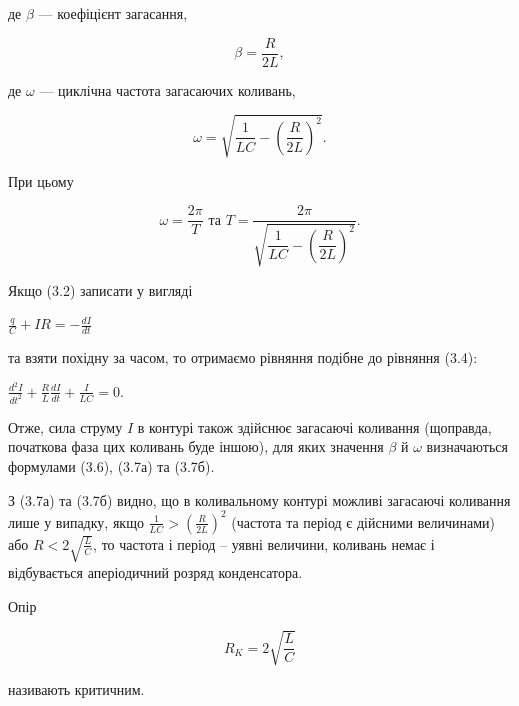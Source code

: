 \documentclass[12pt,a4paper]{article}
\begin{document}
    де $\beta$ --- коефіцієнт загасання,

    \begin{equation}
        \beta = \frac{R}{2L},
        \tag{3.6}
    \end{equation}

    де $\omega$ --- циклічна частота загасаючих коливань,

    \begin{equation}
        \omega = \sqrt{\frac{1}{LC} - \left( \frac{R}{2L}\right)^2}.
        \tag{3.7а}
    \end{equation}

    При цьому

    \begin{equation}
        \omega = \frac{2\pi}{T} \text{  та  } T = \frac{2\pi}{\sqrt{\dfrac{1}{LC} - \left( \dfrac{R}{2L}\right)^2}}.
        \tag{3.7б}
    \end{equation}

    Якщо (3.2) записати у вигляді

    \begin{center}
        $\displaystyle \frac{q}{C} + IR = -\frac{dI}{dt}$
    \end{center}

    та взяти похідну за часом, то отримаємо рівняння подібне до рівняння (3.4):

    \begin{center}
        $\displaystyle \frac{d^2I}{dt^2} + \frac{R}{L} \frac{dI}{dt} + \frac{I}{LC} = 0$.
    \end{center}

    Отже, сила струму $I$ в контурі також здійснює загасаючі коливання (щоправда, початкова фаза цих коливань буде іншою),
    для яких значення $\beta$ й $\omega$ визначаються формулами (3.6), (3.7а) та (3.7б).

    З (3.7а) та (3.7б) видно, що в коливальному контурі можливі загасаючі коливання лише у випадку,
    якщо $\displaystyle \frac{1}{LC} > \left( \frac{R}{2L}\right)^2$ (частота та період є дійсними величинами)
    або $\displaystyle R < 2\sqrt{\frac{L}{C}}$, то частота і період – уявні величини, коливань немає і відбувається
    аперіодичний розряд конденсатора.

    Опір

    \begin{equation}
        R_K = 2\sqrt{\frac{L}{C}}
        \tag{3.8}
    \end{equation}

    називають критичним.
\end{document}
